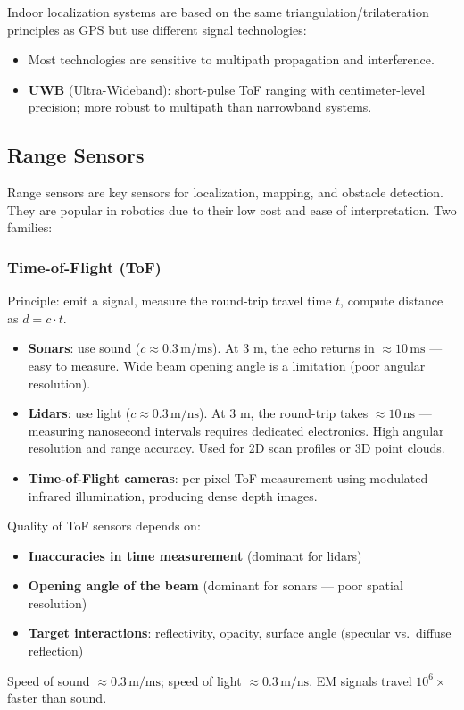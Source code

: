 \documentclass[11pt,a4paper]{article}
\theoremstyle{definition}
\theoremstyle{plain}
\theoremstyle{remark}
\begin{document}
Indoor localization systems are based on the same triangulation/trilateration principles as GPS but use different signal technologies:
\begin{itemize}
    \item Most technologies are sensitive to multipath propagation and interference.
    \item \textbf{UWB} (Ultra-Wideband): short-pulse ToF ranging with centimeter-level precision; more robust to multipath than narrowband systems.
\end{itemize}

\subsection{Range Sensors}

Range sensors are key sensors for localization, mapping, and obstacle detection. They are popular in robotics due to their low cost and ease of interpretation. Two families:

\subsubsection*{Time-of-Flight (ToF)}

Principle: emit a signal, measure the round-trip travel time $t$, compute distance as $d = c \cdot t$.

\begin{itemize}
    \item \textbf{Sonars}: use sound ($c \approx 0.3\,\text{m/ms}$). At 3 m, the echo returns in $\approx 10\,\text{ms}$ — easy to measure. Wide beam opening angle is a limitation (poor angular resolution).
    \item \textbf{Lidars}: use light ($c \approx 0.3\,\text{m/ns}$). At 3 m, the round-trip takes $\approx 10\,\text{ns}$ — measuring nanosecond intervals requires dedicated electronics. High angular resolution and range accuracy. Used for 2D scan profiles or 3D point clouds.
    \item \textbf{Time-of-Flight cameras}: per-pixel ToF measurement using modulated infrared illumination, producing dense depth images.
\end{itemize}

\begin{tcolorbox}[colback=blue!5!white,colframe=blue!75!black,title=\textbf{ToF Accuracy Factors}]
Quality of ToF sensors depends on:
\begin{itemize}
    \item \textbf{Inaccuracies in time measurement} (dominant for lidars)
    \item \textbf{Opening angle of the beam} (dominant for sonars — poor spatial resolution)
    \item \textbf{Target interactions}: reflectivity, opacity, surface angle (specular vs.\ diffuse reflection)
\end{itemize}
Speed of sound $\approx 0.3\,\text{m/ms}$; speed of light $\approx 0.3\,\text{m/ns}$. EM signals travel $10^6\times$ faster than sound.
\end{tcolorbox}
\end{document}
